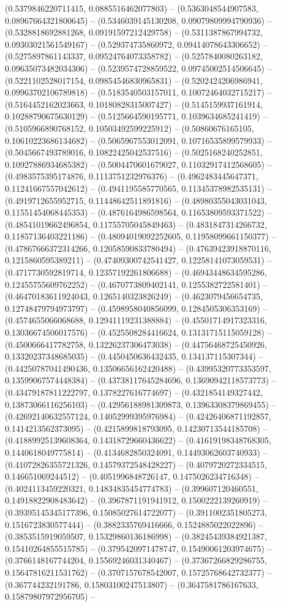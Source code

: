 (0.5379846220711415, 0.0885516462077803) -- (0.5363048544907583, 0.08967664321800645) -- (0.5346039145130208, 0.09079809994790936) -- (0.5328818692881268, 0.09191597212429758) -- (0.5311387867994732, 0.09303021561549167) -- (0.529374735860972, 0.09414078643306652) -- (0.5275897861143337, 0.09524764073358782) -- (0.5257840080263182, 0.09635073482034306) -- (0.5239574728859522, 0.09745002514506645) -- (0.5221102528017154, 0.09854546830965831) -- (0.5202424206986941, 0.09963702106789818) -- (0.5183540503157011, 0.10072464032715217) -- (0.5164452162023663, 0.10180828315007427) -- (0.5145159937161914, 0.10288790675630129) -- (0.5125664590195771, 0.1039634685241419) -- (0.5105966890768152, 0.10503492599225912) -- (0.50860676165105, 0.10610223686134682) -- (0.5065967553012091, 0.10716535899579933) -- (0.5045667493789016, 0.10822425042537516) -- (0.5025168240252851, 0.10927886934685382) -- (0.5004470601679027, 0.11032917412568605) -- (0.4983575395174876, 0.1113751232976376) -- (0.4962483445647371, 0.11241667557042612) -- (0.4941195585770565, 0.11345378982535131) -- (0.4919712655952715, 0.11448642511891816) -- (0.48980355043031043, 0.11551454068445353) -- (0.4876164986598564, 0.11653809593371522) -- (0.48541019662496854, 0.11755705045849463) -- (0.4831847314266732, 0.11857136403221186) -- (0.48094019092252605, 0.11958099661150377) -- (0.47867666372314266, 0.12058590833780494) -- (0.47639423918870116, 0.1215860595389211) -- (0.47409300742541427, 0.12258141073059531) -- (0.4717730592819714, 0.12357192261806688) -- (0.46943448634595286, 0.12455755609762252) -- (0.4670773809402141, 0.1255382722581401) -- (0.46470183611924043, 0.1265140323826249) -- (0.4623079456654735, 0.12748479794973797) -- (0.4598958040856099, 0.1284505306353169) -- (0.4574655066068688, 0.12941119231388884) -- (0.45501714917323316, 0.13036674506017576) -- (0.4525508284416624, 0.13131715115059128) -- (0.4500666417782758, 0.13226237306473038) -- (0.44756468725450926, 0.13320237348685035) -- (0.4450450636432435, 0.134137115307344) -- (0.44250787041490436, 0.13506656162420488) -- (0.43995320773353597, 0.13599067574448384) -- (0.43738117645284696, 0.13690942118573773) -- (0.43479187811222797, 0.1378227616774697) -- (0.4321854149327442, 0.13873066116256103) -- (0.42956188981309873, 0.13963308379869455) -- (0.42692140632557124, 0.14052999395976984) -- (0.42426406871192857, 0.1414213562373095) -- (0.4215899818793095, 0.14230713544185708) -- (0.41889925139608364, 0.14318729660436622) -- (0.41619198348768305, 0.1440618049775814) -- (0.4134682850324091, 0.14493062603740933) -- (0.41072826355721326, 0.14579372548428227) -- (0.4079720272334515, 0.146651069244512) -- (0.4051996848726147, 0.1475026234716348) -- (0.4024113459220321, 0.14834835454774783) -- (0.399607120460551, 0.14918822908483642) -- (0.3967871191941912, 0.1500222139260919) -- (0.39395145345177396, 0.15085027614722077) -- (0.3911002351805273, 0.1516723830577444) -- (0.3882335769416666, 0.1524885022022896) -- (0.3853515919059507, 0.15329860136186998) -- (0.38245439384921387, 0.15410264855515785) -- (0.3795420971478747, 0.15490061203974675) -- (0.3766148167744204, 0.15569246031340467) -- (0.37367266829286755, 0.15647816211531762) -- (0.3707157678542007, 0.15725768642732377) -- (0.367744232191786, 0.15803100247513807) -- (0.3647581786167633, 0.15879807972956705) -- 